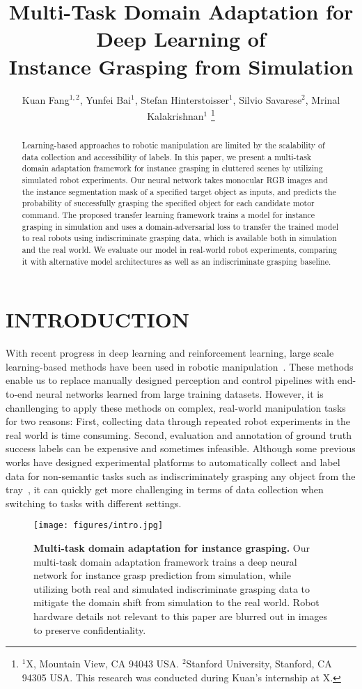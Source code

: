 \documentclass[letterpaper, 10 pt, conference]{ieeeconf}  %
\title{\LARGE \bf
Multi-Task Domain Adaptation for Deep Learning of\\
Instance Grasping from Simulation
}
\author{Kuan Fang$^{1, 2}$, Yunfei Bai$^{1}$, Stefan Hinterstoisser$^{1}$, Silvio Savarese$^{2}$, Mrinal Kalakrishnan$^{1}$
\thanks{$^{1}$X, Mountain View, CA 94043 USA. $^{2}$Stanford University, Stanford, CA 94305 USA. This research was conducted during Kuan's internship at X.}}
\begin{document}
\maketitle
\thispagestyle{empty}
\pagestyle{empty}


\begin{abstract}

Learning-based approaches to robotic manipulation are limited by the scalability of data collection and accessibility of labels. In this paper, we present a multi-task domain adaptation framework for instance grasping in cluttered scenes by utilizing simulated robot experiments. Our neural network takes monocular RGB images and the instance segmentation mask of a specified target object as inputs, and predicts the probability of successfully grasping the specified object for each candidate motor command. The proposed transfer learning framework trains a model for instance grasping in simulation and uses a domain-adversarial loss to transfer the trained model to real robots using indiscriminate grasping data, which is available both in simulation and the real world. We evaluate our model in real-world robot experiments, comparing it with alternative model architectures as well as an indiscriminate grasping baseline.

\end{abstract}


\section{INTRODUCTION}
With recent progress in deep learning and reinforcement learning, large scale learning-based methods have been used in robotic manipulation~\cite{levine2016learning,gupta,kappler}. These methods enable us to replace manually designed perception and control pipelines with end-to-end neural networks learned from large training datasets. However, it is chanllenging to apply these methods on complex, real-world manipulation tasks for two reasons: First, collecting data through repeated robot experiments in the real world is time consuming. Second, evaluation and annotation of ground truth success labels can be expensive and sometimes infeasible. Although some previous works have designed experimental platforms to automatically collect and label data for non-semantic tasks such as indiscriminately grasping any object from the tray~\cite{levine2016learning}, it can quickly get more challenging in terms of data collection when switching to tasks with different settings.
\begin{figure}[ht]
\centering
\texttt{[image: figures/intro.jpg]}
\caption{\textbf{Multi-task domain adaptation for instance grasping.} Our multi-task domain adaptation framework trains a deep neural network for instance grasp prediction from simulation, while utilizing both real and simulated indiscriminate grasping data to mitigate the domain shift from simulation to the real world. Robot hardware details not relevant to this paper are blurred out in images to preserve confidentiality.}
\label{fig:intro}
\vspace{-6mm}
\end{figure}
\end{document}
